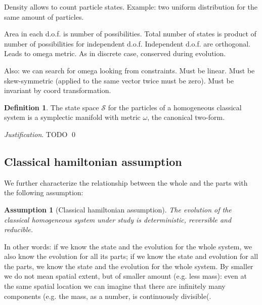 \documentclass[aps,pra,10pt,twocolumn,floatfix,nofootinbib]{revtex4-1}
\newtheorem{assump}{Assumption}
\theoremstyle{definition}
\newtheorem{defn}[prop]{Definition}
\newenvironment{justification}{\emph{Justification}.}{\qed}
\begin{document}
Density allows to count particle states. Example: two uniform distribution for the same amount of particles.

Area in each d.o.f. is number of possibilities. Total number of states is product of number of possibilities for independent d.o.f. Independent d.o.f. are orthogonal. Leads to omega metric. As in discrete case, conserved during evolution.

Also: we can search for omega looking from constraints. Must be linear. Must be skew-symmetric (applied to the same vector twice must be zero). Must be invariant by coord transformation. 

\begin{defn}\label{symplectic_manifold}
	The state space $\mathcal{S}$ for the particles of a homogeneous classical  system is a symplectic manifold with metric $\omega$, the canonical two-form.
\end{defn}

\begin{justification}
	TODO
\end{justification}

\subsection{Classical hamiltonian assumption}


We further characterize the relationship between the whole and the parts with the following assumption:

\begin{assump}[Classical hamiltonian assumption]\label{classical}
	The evolution of the classical homogeneous system under study is deterministic, reversible and reducible.
\end{assump}

In other words: if we know the state and the evolution for the whole system, we also know the evolution for all its parts; if we know the state and evolution for all the parts, we know the state and the evolution for the whole system. By smaller we do not mean spatial extent, but of smaller amount (e.g. less mass): even at the same spatial location we can imagine that there are infinitely many components (e.g. the mass, as a number, is continuously divisible(.
\end{document}
